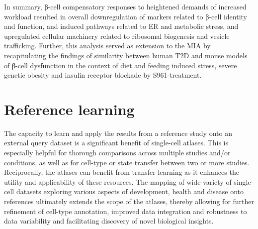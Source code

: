 In summary, β-cell compensatory responses to heightened demands of increased workload resulted in overall downregulation of markers related to β-cell identity and function, and induced pathways related to ER and metabolic stress,  and upregulated cellular machinery related to ribosomal biogenesis and  vesicle trafficking. Further, this analysis served as extension to the MIA by recapitulating the findings of similarity between human T2D and mouse models of β-cell dysfunction in the context of diet and feeding induced stress, severe genetic obesity and insulin receptor blockade by S961-treatment. 

\clearpage

\section{Reference learning}
\label{sec:chp3_validation}


The capacity to learn and apply the results from a reference study onto an external query dataset is a significant benefit of single-cell atlases. This is especially helpful for thorough comparisons across multiple studies and/or conditions, as well as for cell-type or state transfer between two or more studies. Reciprocally, the atlases can benefit from transfer learning as it enhances the utility and applicability of these resources. The mapping of wide-variety of single-cell datasets exploring various aspects of development, health and disease onto references ultimately extends the scope of the atlases, thereby allowing for further refinement of cell-type annotation, improved data integration and robustness to data variability and facilitating discovery of novel biological insights.\\

